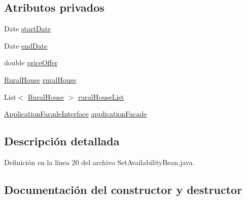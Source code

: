 \subsection*{Atributos privados}
\begin{DoxyCompactItemize}
\item 
Date \mbox{\hyperlink{classcom_1_1ruralhousejsf_1_1model_1_1availability_1_1_set_availability_bean_a6962c301508cdd26f40a28468d59009c}{start\+Date}}
\item 
Date \mbox{\hyperlink{classcom_1_1ruralhousejsf_1_1model_1_1availability_1_1_set_availability_bean_a1620f454f1d1fe18418037a9490744cd}{end\+Date}}
\item 
double \mbox{\hyperlink{classcom_1_1ruralhousejsf_1_1model_1_1availability_1_1_set_availability_bean_a3887b9317413abac9db351e53198f03b}{price\+Offer}}
\item 
\mbox{\hyperlink{classcom_1_1ruralhousejsf_1_1domain_1_1_rural_house}{Rural\+House}} \mbox{\hyperlink{classcom_1_1ruralhousejsf_1_1model_1_1availability_1_1_set_availability_bean_a38f4f2cc1f2c0647c1dea95c3e9c2fea}{rural\+House}}
\item 
List$<$ \mbox{\hyperlink{classcom_1_1ruralhousejsf_1_1domain_1_1_rural_house}{Rural\+House}} $>$ \mbox{\hyperlink{classcom_1_1ruralhousejsf_1_1model_1_1availability_1_1_set_availability_bean_a5505b4ba943e6db5ce5a8b23693b6349}{rural\+House\+List}}
\item 
\mbox{\hyperlink{interfacecom_1_1ruralhousejsf_1_1business_logic_1_1_application_facade_interface}{Application\+Facade\+Interface}} \mbox{\hyperlink{classcom_1_1ruralhousejsf_1_1model_1_1availability_1_1_set_availability_bean_a1761e4ea575572afa2a495de5eadbd7b}{application\+Facade}}
\end{DoxyCompactItemize}


\subsection{Descripción detallada}


Definición en la línea 20 del archivo Set\+Availability\+Bean.\+java.



\subsection{Documentación del constructor y destructor}
\mbox{\label{classcom_1_1ruralhousejsf_1_1model_1_1availability_1_1_set_availability_bean_a5eb9c427878e584a4850a8f48fcdbdb7}} 
